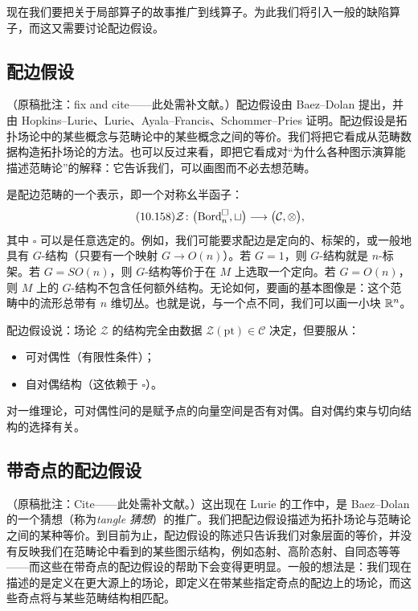 现在我们要把关于局部算子的故事推广到线算子。为此我们将引入一般的缺陷算子，而这又需要讨论配边假设。

\subsection{配边假设}\label{sec:10-8-1}

（原稿批注：fix and cite——此处需补文献。）配边假设由 Baez--Dolan 提出，并由 Hopkins--Lurie、Lurie、Ayala--Francis、Schommer--Pries 证明。配边假设是拓扑场论中的某些概念与范畴论中的某些概念之间的等价。我们将把它看成从范畴数据构造拓扑场论的方法。也可以反过来看，即把它看成对“为什么各种图示演算能描述范畴论”的解释：它告诉我们，可以画图而不必去想范畴。

是配边范畴的一个表示，即一个对称幺半函子：
\begin{equation}\tag{10.158}
\mathcal{Z}\colon\big(\mathrm{Bord}_n^{\square},\sqcup\big)\longrightarrow\big(\mathcal{C},\otimes\big),
\end{equation}
其中 $\square$ 可以是任意选定的。例如，我们可能要求配边是定向的、标架的，或一般地具有 $G$-结构（只要有一个映射 $G\to O(n)$）。若 $G=1$，则 $G$-结构就是 $n$-标架。若 $G=SO(n)$，则 $G$-结构等价于在 $M$ 上选取一个定向。若 $G=O(n)$，则 $M$ 上的 $G$-结构不包含任何额外结构。无论如何，要画的基本图像是：这个范畴中的流形总带有 $n$ 维切丛。也就是说，与一个点不同，我们可以画一小块 $\mathbb{R}^n$。

配边假设说：场论 $\mathcal{Z}$ 的结构完全由数据 $\mathcal{Z}(\mathrm{pt})\in\mathcal{C}$ 决定，但要服从：
\begin{itemize}
\item 可对偶性（有限性条件）；
\item 自对偶结构（这依赖于 $\square$）。
\end{itemize}
对一维理论，可对偶性问的是赋予点的向量空间是否有对偶。自对偶约束与切向结构的选择有关。

\subsection{带奇点的配边假设}\label{sec:10-8-2}

（原稿批注：Cite——此处需补文献。）这出现在 Lurie 的工作中，是 Baez--Dolan 的一个猜想（称为\emph{tangle 猜想}）的推广。我们把配边假设描述为拓扑场论与范畴论之间的某种等价。到目前为止，配边假设的陈述只告诉我们对象层面的等价，并没有反映我们在范畴论中看到的某些图示结构，例如态射、高阶态射、自同态等等——而这些在带奇点的配边假设的帮助下会变得更明显。一般的想法是：我们现在描述的是定义在更大源上的场论，即定义在带某些指定奇点的配边上的场论，而这些奇点将与某些范畴结构相匹配。

